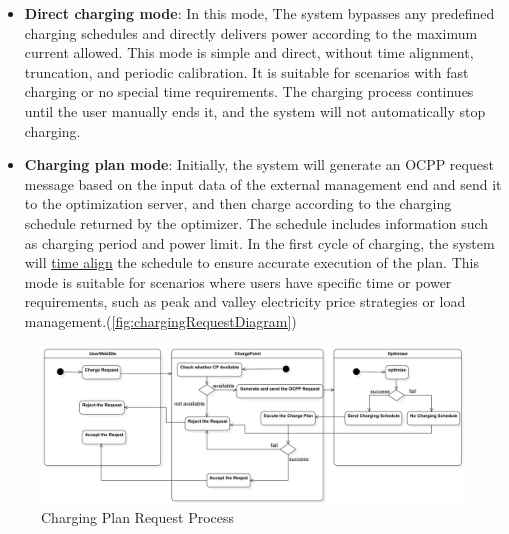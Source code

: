 \documentclass[
english,
ruledheaders=section,%
class=report,%
thesis={type=Report},%
accentcolor=9c,%
custommargins=true,%
marginpar=false,%
parskip=half-,%
fontsize=11pt,%
logofile={img/tuda_logo.pdf}, %
]{tudapub}
\begin{document}
\begin{enumerate}[label=\Alph*.]

        \begin{itemize}
            \item \textbf{Direct charging mode}:
            In this mode, The system bypasses any predefined charging schedules and directly delivers power according to the maximum current allowed. This mode is simple and direct, without time alignment, truncation, and periodic calibration. It is suitable for scenarios with fast charging or no special time requirements. The charging process continues until the user manually ends it, and the system will not automatically stop charging.
            \item \textbf{Charging plan mode}:
            Initially, the system will generate an OCPP request message based on the input data of the external management end and send it to the optimization server, and then charge according to the charging schedule returned by the optimizer. The schedule includes information such as charging period and power limit. In the first cycle of charging, the system will \hyperref[para:timeSynchronAndSplit]{time align} the schedule to ensure accurate execution of the plan. This mode is suitable for scenarios where users have specific time or power requirements, such as peak and valley electricity price strategies or load management.(\autoref{fig:chargingRequestDiagram})
        \end{itemize}
        \begin{figure}
            \centering
            \includegraphics[width=1\linewidth]{img/ChargingRequestDiagram.png}
            \caption{Charging Plan Request Process}
            \label{fig:chargingRequestDiagram}
        \end{figure}


\end{enumerate}
\end{document}
